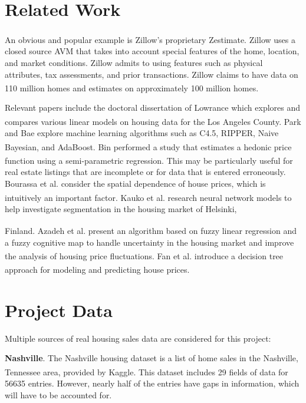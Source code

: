 \documentclass[10pt]{article}
\begin{document}
\begin{multicols}{2}
		\section{Related Work}
		An obvious and popular example is Zillow's proprietary Zestimate\textsuperscript{\textregistered}. Zillow uses a closed source AVM that takes into account special features of the home, location, and market conditions. Zillow admits to using features such as physical attributes, tax assessments, and prior transactions. Zillow claims to have data on 110 million homes and estimates on approximately 100 million homes.\textsuperscript{\cite{zillow}}

		Relevant papers include the doctoral dissertation of Lowrance which explores and compares various linear models on housing data for the Los Angeles County.\textsuperscript{\cite{lowrance}} Park and Bae explore machine learning algorithms such as C4.5, RIPPER, Naive Bayesian, and AdaBoost.\textsuperscript{\cite{park}} Bin performed a study that estimates a hedonic price function using a semi-parametric regression.\textsuperscript{\cite{bin}} This may be particularly useful for real estate listings that are incomplete or for data that is entered erroneously. Bourassa et al. consider the spatial dependence of house prices, which is intuitively an important factor.\textsuperscript{\cite{bourassa1}\cite{bourassa2}} Kauko et al. research neural network models to help investigate segmentation in the housing market of Helsinki, 
		
		Finland.\textsuperscript{\cite{kauko}} Azadeh et al. present an algorithm based on fuzzy linear regression and a fuzzy cognitive map to handle uncertainty in the housing market and improve the analysis of housing price fluctuations.\textsuperscript{\cite{azadeh}} Fan et al. introduce a decision tree approach for modeling and predicting house prices.\textsuperscript{\cite{fan}}

		\section{Project Data}
		Multiple sources of real housing sales data are considered for this project:

		\textbf{Nashville}. The Nashville housing dataset is a list of home sales in the Nashville, Tennessee area, provided by Kaggle\textsuperscript{\cite{nashville_data}}. This dataset includes 29 fields of data for 56635 entries. However, nearly half of the entries have gaps in information, which will have to be accounted for.


\end{multicols}
\end{document}
